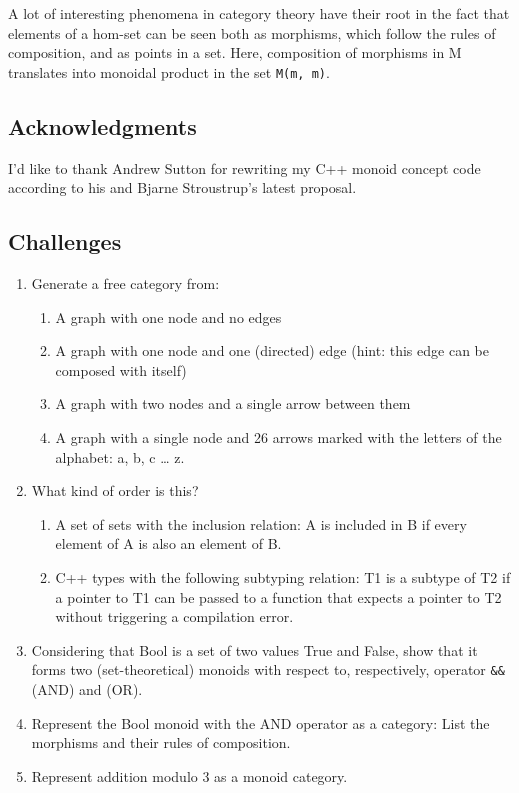 A lot of interesting phenomena in category theory have their root in the
fact that elements of a hom-set can be seen both as morphisms, which
follow the rules of composition, and as points in a set. Here,
composition of morphisms in M translates into monoidal product in the
set \texttt{M(m, m)}.

\subsection{Acknowledgments}\label{acknowledgments}

I'd like to thank Andrew Sutton for rewriting my C++ monoid concept code
according to his and Bjarne Stroustrup's latest proposal.

\subsection{Challenges}\label{challenges}

\begin{enumerate}
\item
  Generate a free category from:

  \begin{enumerate}
  \tightlist
  \item
    A graph with one node and no edges
  \item
    A graph with one node and one (directed) edge (hint: this edge can
    be composed with itself)
  \item
    A graph with two nodes and a single arrow between them
  \item
    A graph with a single node and 26 arrows marked with the letters of
    the alphabet: a, b, c \ldots{} z.
  \end{enumerate}
\item
  What kind of order is this?

  \begin{enumerate}
  \tightlist
  \item
    A set of sets with the inclusion relation: A is included in B if
    every element of A is also an element of B.
  \item
    C++ types with the following subtyping relation: T1 is a subtype of
    T2 if a pointer to T1 can be passed to a function that expects a
    pointer to T2 without triggering a compilation error.
  \end{enumerate}
\item
  Considering that Bool is a set of two values True and False, show that
  it forms two (set-theoretical) monoids with respect to, respectively,
  operator \texttt{\&\&} (AND) and \texttt{\textbar{}\textbar{}} (OR).
\item
  Represent the Bool monoid with the AND operator as a category: List
  the morphisms and their rules of composition.
\item
  Represent addition modulo 3 as a monoid category.
\end{enumerate}